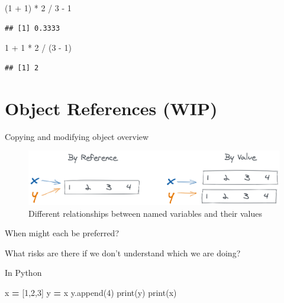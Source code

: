 \documentclass[
]{krantz}
\makeatletter
\newenvironment{Shaded}{\begin{snugshade}}{\end{snugshade}}
\newcommand{\BuiltInTok}[1]{#1}
\newcommand{\DecValTok}[1]{\textcolor[rgb]{0.06,0.06,0.06}{#1}}
\newcommand{\NormalTok}[1]{#1}
\newcommand{\OperatorTok}[1]{\textcolor[rgb]{0.43,0.43,0.43}{\textbf{#1}}}
\newcommand{\SpecialCharTok}[1]{\textcolor[rgb]{0,0,0}{#1}}
\newenvironment{kframe}{%
\medskip{}
\setlength{\fboxsep}{.8em}
 \def\at@end@of@kframe{}%
 \ifinner\ifhmode%
  \def\at@end@of@kframe{\end{minipage}}%
  \begin{minipage}{\columnwidth}%
 \fi\fi%
 \def\FrameCommand##1{\hskip\@totalleftmargin \hskip-\fboxsep
 \colorbox{shadecolor}{##1}\hskip-\fboxsep
     \hskip-\linewidth \hskip-\@totalleftmargin \hskip\columnwidth}%
 \MakeFramed {\advance\hsize-\width
   \@totalleftmargin\z@ \linewidth\hsize
   \@setminipage}}%
 {\par\unskip\endMakeFramed%
 \at@end@of@kframe}
\renewenvironment{Shaded}{\begin{kframe}}{\end{kframe}}
\makeatother
\begin{document}
\begin{Shaded}
\begin{Highlighting}[]
\NormalTok{(}\DecValTok{1} \SpecialCharTok{+} \DecValTok{1}\NormalTok{) }\SpecialCharTok{*} \DecValTok{2} \SpecialCharTok{/} \DecValTok{3} \SpecialCharTok{{-}} \DecValTok{1}
\end{Highlighting}
\end{Shaded}

\begin{verbatim}
## [1] 0.3333
\end{verbatim}

\begin{Shaded}
\begin{Highlighting}[]
\DecValTok{1} \SpecialCharTok{+} \DecValTok{1} \SpecialCharTok{*} \DecValTok{2} \SpecialCharTok{/}\NormalTok{ (}\DecValTok{3} \SpecialCharTok{{-}} \DecValTok{1}\NormalTok{)}
\end{Highlighting}
\end{Shaded}

\begin{verbatim}
## [1] 2
\end{verbatim}

\hypertarget{object-references-wip}{%
\section{Object References (WIP)}\label{object-references-wip}}

Copying and modifying object overview

\begin{figure}

{\centering \includegraphics[width=0.9\linewidth]{figures/comp-quan/ref-val} 

}

\caption{Different relationships between named variables and their values}\label{fig:unnamed-chunk-74}
\end{figure}

When might each be preferred?

What risks are there if we don't understand which we are doing?

In Python

\begin{Shaded}
\begin{Highlighting}[]
\NormalTok{x }\OperatorTok{=}\NormalTok{ [}\DecValTok{1}\NormalTok{,}\DecValTok{2}\NormalTok{,}\DecValTok{3}\NormalTok{]}
\NormalTok{y }\OperatorTok{=}\NormalTok{ x}
\NormalTok{y.append(}\DecValTok{4}\NormalTok{)}
\BuiltInTok{print}\NormalTok{(y)}
\BuiltInTok{print}\NormalTok{(x)}
\end{Highlighting}
\end{Shaded}
\end{document}
